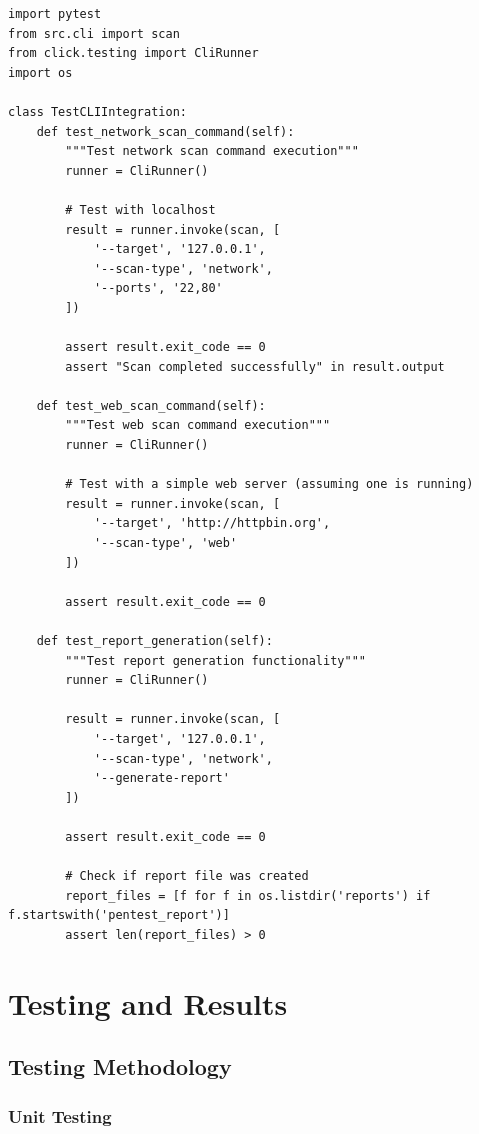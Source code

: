 \documentclass[12pt,a4paper]{report}
\begin{document}
\begin{lstlisting}[caption=Integration Test Example]
import pytest
from src.cli import scan
from click.testing import CliRunner
import os

class TestCLIIntegration:
    def test_network_scan_command(self):
        """Test network scan command execution"""
        runner = CliRunner()
        
        # Test with localhost
        result = runner.invoke(scan, [
            '--target', '127.0.0.1',
            '--scan-type', 'network',
            '--ports', '22,80'
        ])
        
        assert result.exit_code == 0
        assert "Scan completed successfully" in result.output
    
    def test_web_scan_command(self):
        """Test web scan command execution"""
        runner = CliRunner()
        
        # Test with a simple web server (assuming one is running)
        result = runner.invoke(scan, [
            '--target', 'http://httpbin.org',
            '--scan-type', 'web'
        ])
        
        assert result.exit_code == 0
    
    def test_report_generation(self):
        """Test report generation functionality"""
        runner = CliRunner()
        
        result = runner.invoke(scan, [
            '--target', '127.0.0.1',
            '--scan-type', 'network',
            '--generate-report'
        ])
        
        assert result.exit_code == 0
        
        # Check if report file was created
        report_files = [f for f in os.listdir('reports') if f.startswith('pentest_report')]
        assert len(report_files) > 0
\end{lstlisting}

\chapter{Testing and Results}

\section{Testing Methodology}

\subsection{Unit Testing}
\end{document}
